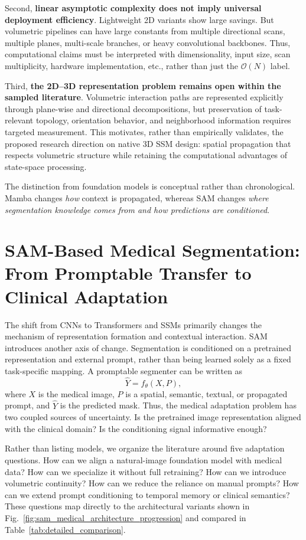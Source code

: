 \documentclass[5p,times,authoryear]{elsarticle}
\begin{document}
Second, \textbf{linear asymptotic complexity does not imply universal deployment efficiency}. Lightweight 2D variants show large savings. But volumetric pipelines can have large constants from multiple directional scans, multiple planes, multi-scale branches, or heavy convolutional backbones. Thus, computational claims must be interpreted with dimensionality, input size, scan multiplicity, hardware implementation, etc., rather than just the $\mathcal{O}(N)$ label.

Third, \textbf{the 2D--3D representation problem remains open within the sampled literature}. Volumetric interaction paths are represented explicitly through plane-wise and directional decompositions, but preservation of task-relevant topology, orientation behavior, and neighborhood information requires targeted measurement. This motivates, rather than empirically validates, the proposed research direction on native 3D SSM design: spatial propagation that respects volumetric structure while retaining the computational advantages of state-space processing.

The distinction from foundation models is conceptual rather than chronological. Mamba changes \emph{how} context is propagated, whereas SAM changes \emph{where segmentation knowledge comes from and how predictions are conditioned}.


\section{SAM-Based Medical Segmentation: From Promptable Transfer to Clinical Adaptation}
\label{sec:sam_review}


The shift from CNNs to Transformers and SSMs primarily changes the mechanism of representation formation and contextual interaction. SAM introduces another axis of change. Segmentation is conditioned on a pretrained representation and external prompt, rather than being learned solely as a fixed task-specific mapping. A promptable segmenter can be written as
\begin{equation}
\hat{Y}=f_{\theta}(X,P),
\end{equation}
where $X$ is the medical image, $P$ is a spatial, semantic, textual, or propagated prompt, and $\hat{Y}$ is the predicted mask. Thus, the medical adaptation problem has two coupled sources of uncertainty. Is the pretrained image representation aligned with the clinical domain? Is the conditioning signal informative enough?

Rather than listing models, we organize the literature around five adaptation questions. How can we align a natural-image foundation model with medical data? How can we specialize it without full retraining? How can we introduce volumetric continuity? How can we reduce the reliance on manual prompts? How can we extend prompt conditioning to temporal memory or clinical semantics? These questions map directly to the architectural variants shown in Fig.~\ref{fig:sam_medical_architecture_progression} and compared in Table~\ref{tab:detailed_comparison}.
\end{document}
